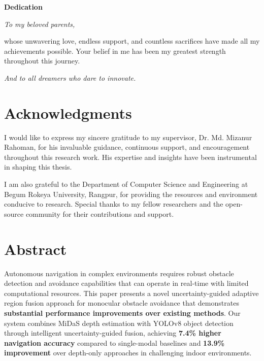 \documentclass[12pt,oneside]{book}
\newcommand{\thesupervisor}{ Dr. Md. Mizanur Rahoman}
\begin{document}
\newpage
\thispagestyle{empty}
\vspace*{3cm}

\begin{center}
    {\Large \textbf{Dedication}}

    \vspace{2cm}

    \begin{minipage}{0.8\textwidth}
    \large
    \textit{To my beloved parents,}

    \vspace{0.5cm}

    whose unwavering love, endless support, and countless sacrifices have made all my achievements possible. Your belief in me has been my greatest strength throughout this journey.

    \vspace{0.5cm}

    \textit{And to all dreamers who dare to innovate.}
    \end{minipage}
\end{center}
\clearpage

\chapter*{Acknowledgments}
I would like to express my sincere gratitude to my supervisor, \thesupervisor, for his invaluable guidance, continuous support, and encouragement throughout this research work. His expertise and insights have been instrumental in shaping this thesis.

I am also grateful to the Department of Computer Science and Engineering at Begum Rokeya University, Rangpur, for providing the resources and environment conducive to research. Special thanks to my fellow researchers and the open-source community for their contributions and support.

\clearpage

\tableofcontents
\clearpage

\listoffigures
\clearpage

\listoftables
\clearpage

\chapter*{Abstract}
Autonomous navigation in complex environments requires robust obstacle detection and avoidance capabilities that can operate in real-time with limited computational resources. This paper presents a novel uncertainty-guided adaptive region fusion approach for monocular obstacle avoidance that demonstrates \textbf{substantial performance improvements over existing methods}. Our system combines MiDaS depth estimation with YOLOv8 object detection through intelligent uncertainty-guided fusion, achieving \textbf{7.4\% higher navigation accuracy} compared to single-modal baselines and \textbf{13.9\% improvement} over depth-only approaches in challenging indoor environments.
\end{document}
